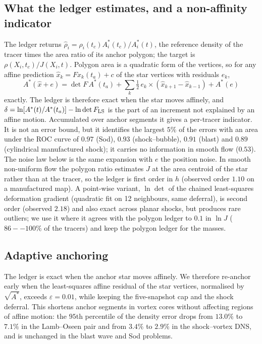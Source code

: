 \documentclass[11pt]{article}
\theoremstyle{definition}\newtheorem{definition}{Definition}\theoremstyle{remark}\newtheorem{remark}{Remark}
\begin{document}
\subsection{What the ledger estimates, and a non-affinity indicator}
The ledger returns $\hat\rho_i=\rho_i(t_c)A^\ast_i(t_c)/A^\ast_i(t)$, the reference density of the tracer times the area ratio of its anchor polygon; the target is $\rho(X_i,t_c)/J(X_i,t)$. Polygon area is a quadratic form of the vertices, so for any affine prediction $\hat x_k=Fx_k(t_a)+c$ of the star vertices with residuals $e_k$,
\begin{equation}
A^\ast(\hat x+e)=\det F\,A^\ast(t_a)+\sum_k\tfrac12\,e_k\times(\hat x_{k+1}-\hat x_{k-1})+A^\ast(e)
\end{equation}
exactly. The ledger is therefore exact when the star moves affinely, and $\delta=\ln[A^\ast(t)/A^\ast(t_a)]-\ln\det F_{\rm LS}$ is the part of an increment not explained by an affine motion. Accumulated over anchor segments it gives a per-tracer indicator. It is not an error bound, but it identifies the largest $5\%$ of the errors with an area under the ROC curve of $0.97$ (Sod), $0.93$ (shock--bubble), $0.91$ (blast) and $0.89$ (cylindrical manufactured shock); it carries no information in smooth flow ($0.53$). The noise law below is the same expansion with $e$ the position noise. In smooth non-uniform flow the polygon ratio estimates $J$ at the area centroid of the star rather than at the tracer, so the ledger is first order in $h$ (observed order $1.10$ on a manufactured map). A point-wise variant, $\ln\det$ of the chained least-squares deformation gradient (quadratic fit on 12 neighbours, same deferral), is second order (observed $2.18$) and also exact across planar shocks, but produces rare outliers; we use it where it agrees with the polygon ledger to $0.1$ in $\ln J$ ($86--100\%$ of the tracers) and keep the polygon ledger for the masses.

\subsection{Adaptive anchoring}
The ledger is exact when the anchor star moves affinely. We therefore re-anchor early when the least-squares affine residual of the star vertices, normalised by $\sqrt{A^\ast}$, exceeds $\varepsilon=0.01$, while keeping the five-snapshot cap and the shock deferral. This shortens anchor segments in vortex cores without affecting regions of affine motion: the $95$th percentile of the density error drops from $13.0\%$ to $7.1\%$ in the Lamb--Oseen pair and from $3.4\%$ to $2.9\%$ in the shock--vortex DNS, and is unchanged in the blast wave and Sod problems.
\end{document}
